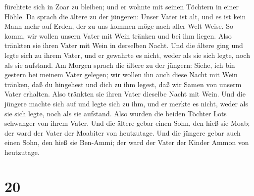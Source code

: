 fürchtete sich in Zoar zu bleiben; und er wohnte mit seinen Töchtern in
einer Höhle.  Da sprach die ältere zu der jüngeren: Unser
Vater ist alt, und es ist kein Mann mehr auf Erden, der zu uns kommen
möge nach aller Welt Weise.  So komm, wir wollen unsern
Vater mit Wein tränken und bei ihm liegen.  Also tränkten
sie ihren Vater mit Wein in derselben Nacht. Und die ältere ging und
legte sich zu ihrem Vater, und er gewahrte es nicht, weder als sie sich
legte, noch als sie aufstand.  Am Morgen sprach die
ältere zu der jüngern: Siehe, ich bin gestern bei meinem Vater gelegen;
wir wollen ihn auch diese Nacht mit Wein tränken, daß du hingehest und
dich zu ihm legest, daß wir Samen von unserm Vater erhalten.
 Also tränkten sie ihren Vater dieselbe Nacht mit Wein.
Und die jüngere machte sich auf und legte sich zu ihm, und er merkte es
nicht, weder als sie sich legte, noch als sie aufstand. 
Also wurden die beiden Töchter Lots schwanger von ihrem Vater.
 Und die ältere gebar einen Sohn, den hieß sie Moab; der
ward der Vater der Moabiter von heutzutage.  Und die
jüngere gebar auch einen Sohn, den hieß sie Ben-Ammi; der ward der Vater
der Kinder Ammon von heutzutage.

\hypertarget{section-19}{%
\section{20}\label{section-19}}

